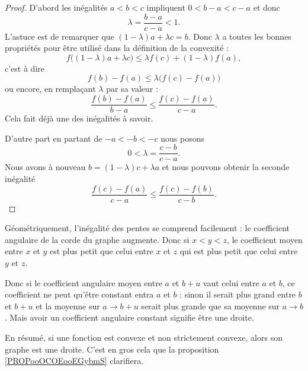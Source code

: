 \begin{proof}
    D'abord les inégalités \( a<b<c\) impliquent \( 0<b-a<c-a\) et donc
    \begin{equation}
        \lambda=\frac{ b-a }{ c-a }<1.
    \end{equation}
    L'astuce est de remarquer que \( (1-\lambda)a+\lambda c=b\). Donc \( \lambda\) a toutes les bonnes propriétés pour être utilisé dans la définition de la convexité :
    \begin{equation}
        f\big( (1-\lambda)a+\lambda c \big)\leq \lambda f(c)+(1-\lambda)f(a),
    \end{equation}
    c'est à dire
    \begin{equation}
        f(b)-f(a)\leq \lambda\big( f(c)-f(a) \big)
    \end{equation}
    ou encore, en remplaçant \( \lambda\) par sa valeur :
    \begin{equation}
        \frac{ f(b)-f(a) }{ b-a }\leq \frac{ f(c)-f(a) }{ c-a }.
    \end{equation}
    Cela fait déjà une des inégalités à savoir.
    
    D'autre part en partant de \( -a<-b<-c\) nous posons
    \begin{equation}
        0<\lambda=\frac{ c-b }{ c-a }.
    \end{equation}
    Nous avons à nouveau \( b=(1-\lambda)c+\lambda a\) et nous pouvons obtenir la seconde inégalité
    \begin{equation}
        \frac{ f(c)-f(a) }{ c-a }\leq \frac{ f(c)-f(b) }{ c-b }.
    \end{equation}
\end{proof}

Géométriquement, l'inégalité des pentes se comprend facilement : le coefficient angulaire de la corde du graphe augmente. Donc si \( x<y<z\), le coefficient moyen entre \( x\) et \( y\) est plus petit que celui entre \( x\) et \( z\) qui est plus petit que celui entre \( y\) et \( z\).

Donc si le coefficient angulaire moyen entre \( a\) et \( b+u\) vaut celui entre \( a\) et \( b\), ce coefficient ne peut qu'être constant entra \( a\) et \( b\) : sinon il serait plus grand entre \( b\) et \( b+u\) et la moyenne sur \( a\to b+u\) serait plus grande que sa moyenne sur \( a\to b\). Mais avoir un coefficient angulaire constant signifie être une droite.

En résumé, si une fonction est convexe et non strictement convexe, alors son graphe est une droite. C'est en gros cela que la proposition \ref{PROPooOCOEooEGybmS} clarifiera.

